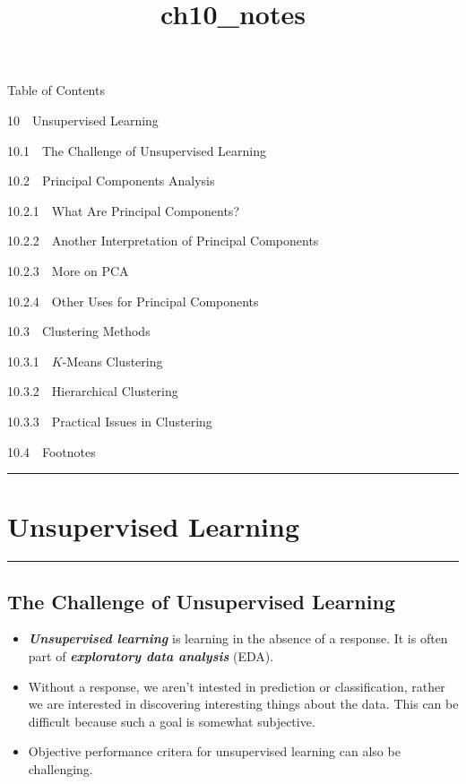 \documentclass[11pt]{article}
\title{ch10\_notes}
\providecommand{\tightlist}{%
      \setlength{\itemsep}{0pt}\setlength{\parskip}{0pt}}
\begin{document}
    
    
    \maketitle
    
    

    
    Table of Contents{}

{{10~~}Unsupervised Learning}

{{10.1~~}The Challenge of Unsupervised Learning}

{{10.2~~}Principal Components Analysis}

{{10.2.1~~}What Are Principal Components?}

{{10.2.2~~}Another Interpretation of Principal Components}

{{10.2.3~~}More on PCA}

{{10.2.4~~}Other Uses for Principal Components}

{{10.3~~}Clustering Methods}

{{10.3.1~~}\(K\)-Means Clustering}

{{10.3.2~~}Hierarchical Clustering}

{{10.3.3~~}Practical Issues in Clustering}

{{10.4~~}Footnotes}

    \begin{center}\rule{0.5\linewidth}{\linethickness}\end{center}

\hypertarget{unsupervised-learning}{%
\section{Unsupervised Learning}\label{unsupervised-learning}}

\begin{center}\rule{0.5\linewidth}{\linethickness}\end{center}

    \hypertarget{the-challenge-of-unsupervised-learning}{%
\subsection{The Challenge of Unsupervised
Learning}\label{the-challenge-of-unsupervised-learning}}

    \begin{itemize}
\tightlist
\item
  \textbf{\emph{Unsupervised learning}} is learning in the absence of a
  response. It is often part of \textbf{\emph{exploratory data
  analysis}} (EDA).
\item
  Without a response, we aren't intested in prediction or
  classification, rather we are interested in discovering interesting
  things about the data. This can be difficult because such a goal is
  somewhat subjective.
\item
  Objective performance critera for unsupervised learning can also be
  challenging.
\end{itemize}
\end{document}
